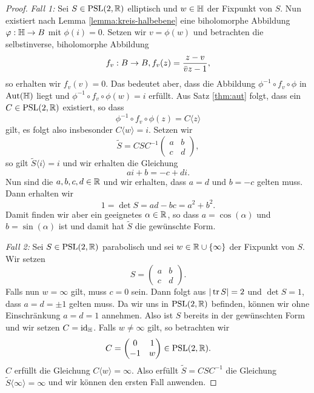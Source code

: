 \begin{proof}
  \emph{Fall 1:} Sei $S \in \operatorname{PSL}(2, \mathbb{R})$ elliptisch und $w \in \mathbb{H}$ der
  Fixpunkt von $S$. Nun existiert nach Lemma \ref{lemma:kreis-halbebene}
  eine biholomorphe Abbildung $\varphi: \mathbb{H} \rightarrow B$ mit $\phi(i) = 0$. Setzen
  wir $v = \phi(w)$ und betrachten die selbstinverse, biholomorphe
  Abbildung
  \[
  f_v : B \rightarrow B, f_v(z) = \frac{z-v}{\bar v z - 1},
  \]
  so erhalten wir $f_v(v) = 0$. Das bedeutet aber, dass die Abbildung
  $\phi^{-1} \circ f_v \circ \phi$ in $\operatorname{Aut}(\mathbb{H})$ liegt und $\phi^{-1}
  \circ f_v \circ \phi (w) = i$ erfüllt. Aus Satz \ref{thm:aut} folgt,
  dass ein $C \in \operatorname{PSL}(2, \mathbb{R})$ existiert, so dass
  \[
  \phi^{-1} \circ f_v \circ \phi(z) = C \langle z \rangle
  \]
  gilt, es folgt also insbesonder $C\langle w \rangle = i$. Setzen wir
  \[
  \tilde S = CSC^{-1}
  \begin{pmatrix}
    a & b\\
    c & d
  \end{pmatrix},
  \]
  so gilt $\tilde S\langle i \rangle = i$ und wir erhalten die
  Gleichung
  \[
  ai +b = -c + di.
  \]
  Nun sind die $a,b,c,d \in \mathbb{R}$ und wir erhalten, dass $a = d$ und $b
  = - c$ gelten muss. Dann erhalten wir
  \[
  1 = \det S = ad - bc = a^2 + b^2.
  \]
  Damit finden wir aber ein geeignetes $\alpha \in \mathbb{R}$, so dass
  $a = \cos(\alpha)$ und $b = \sin(\alpha)$ ist und damit hat $\tilde
  S$ die gewünschte Form.

  \emph{Fall 2:} Sei $S \in \operatorname{PSL}(2, \mathbb{R})$ parabolisch und sei $w \in \mathbb{R}
  \cup \{\infty\}$ der Fixpunkt von $S$. Wir setzen
  \[
  S =
  \begin{pmatrix}
    a & b\\
    c & d
  \end{pmatrix}.
  \]
  Falls nun $w = \infty$ gilt, muss $c =0$ sein. Dann folgt aus
  $|\operatorname{tr} S| = 2$ und $\det S = 1$, dass \break$a = d = \pm 1$ gelten
  muss. Da wir uns in $\operatorname{PSL}(2,\mathbb{R})$ befinden, können wir ohne
  Einschränkung $a = d = 1$ annehmen. Also ist $S$ bereits in der
  gewünschten Form und wir setzen $C = \operatorname{id}_{\mathbb{H}}$. Falls $w \neq \infty$ gilt, so betrachten wir
  \[
  C =
  \begin{pmatrix}
    0 & 1 \\
    -1 & w
  \end{pmatrix}
  \in \operatorname{PSL}(2,\mathbb{R}).
  \]
  $C$ erfüllt die Gleichung $C \langle w \rangle  = \infty$. Also
  erfüllt $\tilde S = C S C^{-1}$ die Gleichung $\tilde S\langle \infty
  \rangle = \infty$ und wir können den ersten Fall anwenden.
  

\end{proof}
